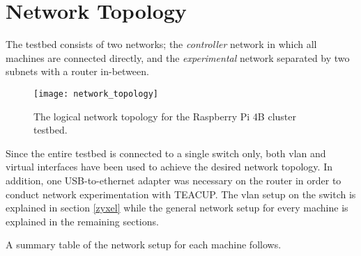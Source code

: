 \section{Network Topology} \label{topology}

The testbed consists of two networks; the \textit{controller} network in which all machines are connected directly, and the \textit{experimental} network separated by two subnets with a router in-between.

\begin{figure}[H]
    \centering
    \texttt{[image: network\_topology]}
    \captionsetup{width=0.8\linewidth}
    \caption{The logical network topology for the Raspberry Pi 4B cluster testbed.}
    \label{fig:network_topology}
\end{figure}

Since the entire testbed is connected to a single switch only, both \gls{vlan} and virtual interfaces have been used to achieve the desired network topology. In addition, one USB-to-ethernet adapter was necessary on the router in order to conduct network experimentation with TEACUP. The \gls{vlan} setup on the switch is explained in section \ref{zyxel} while the general network setup for every machine is explained in the remaining sections.

A summary table of the network setup for each machine follows.

